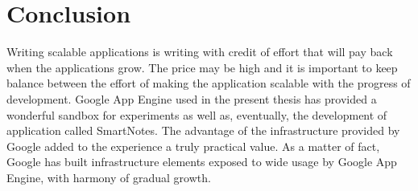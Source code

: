 \chapter{Conclusion}\label{cha:conclusions}
Writing scalable applications is writing with credit of effort that will pay back when the applications grow. The price may be high and it is important to keep balance between the effort of making the application scalable with the progress of development. Google App Engine used in the present thesis has provided a wonderful sandbox for experiments as well as, eventually, the development of application called SmartNotes. The advantage of  the infrastructure provided by Google added to the experience a truly practical value. As a matter of fact, Google has built infrastructure elements exposed to wide usage by Google App Engine,  with harmony of gradual growth. 

